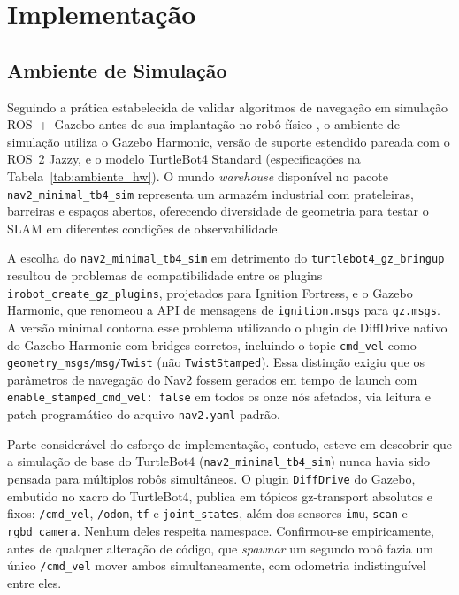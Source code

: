 \chapter{Implementação}
\label{chap:implementacao}

\section{Ambiente de Simulação}
\label{sec:simulacao}

Seguindo a prática estabelecida de validar algoritmos de navegação em simulação
ROS~+~Gazebo antes de sua implantação no robô físico \cite{takaya2016}, o
ambiente de simulação utiliza o Gazebo Harmonic, versão de suporte estendido
pareada com o ROS~2 Jazzy, e o modelo TurtleBot4 Standard
(especificações na Tabela~\ref{tab:ambiente_hw}). O mundo \textit{warehouse} disponível no pacote
\texttt{nav2\_\allowbreak minimal\_\allowbreak tb4\_\allowbreak sim} representa um armazém industrial com prateleiras,
barreiras e espaços abertos, oferecendo diversidade de geometria para testar o SLAM
em diferentes condições de observabilidade.

A escolha do \texttt{nav2\_\allowbreak minimal\_\allowbreak tb4\_\allowbreak sim} em detrimento do
\texttt{turtlebot4\_\allowbreak gz\_\allowbreak bringup} resultou de problemas de compatibilidade entre os
plugins \texttt{irobot\_\allowbreak create\_\allowbreak gz\_\allowbreak plugins}, projetados para Ignition Fortress,
e o Gazebo Harmonic, que renomeou a API de mensagens de \texttt{ignition.msgs} para
\texttt{gz.msgs}. A versão minimal contorna esse problema utilizando o plugin de
DiffDrive nativo do Gazebo Harmonic com bridges corretos, incluindo o topic
\texttt{cmd\_\allowbreak vel} como \texttt{geometry\_\allowbreak msgs/\allowbreak msg/\allowbreak Twist} (não \texttt{TwistStamped}).
Essa distinção exigiu que os parâmetros de navegação do Nav2 fossem gerados em tempo
de launch com \texttt{enable\_\allowbreak stamped\_\allowbreak cmd\_\allowbreak vel: false} em todos os onze nós afetados,
via leitura e patch programático do arquivo \texttt{nav2.yaml} padrão.

Parte considerável do esforço de implementação, contudo, esteve em descobrir
que a simulação de
base do TurtleBot4 (\texttt{nav2\_\allowbreak minimal\_\allowbreak tb4\_\allowbreak sim}) nunca havia sido pensada
para múltiplos robôs simultâneos. O plugin \texttt{DiffDrive} do Gazebo, embutido
no xacro do TurtleBot4, publica em tópicos gz-transport absolutos e fixos:
\texttt{/cmd\_\allowbreak vel}, \texttt{/odom}, \texttt{tf} e \texttt{joint\_\allowbreak states}, além dos sensores
\texttt{imu}, \texttt{scan} e \texttt{rgbd\_\allowbreak camera}. Nenhum deles respeita namespace.
Confirmou-se empiricamente, antes de qualquer alteração de código, que
\textit{spawnar} um segundo robô fazia um único \texttt{/cmd\_\allowbreak vel} mover ambos
simultaneamente, com odometria indistinguível entre eles.

